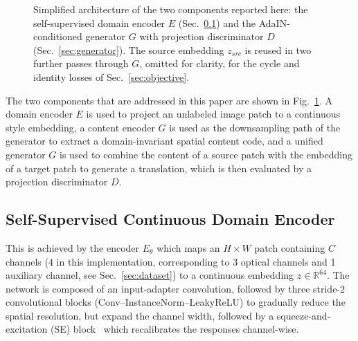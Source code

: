 \documentclass[conference]{IEEEtran}
\begin{document}
\begin{figure}[t]
{}
\caption{Simplified architecture of the two components reported here: the self-supervised domain encoder $E$ (Sec.~\ref{sec:encoder}) and the AdaIN-conditioned generator $G$ with projection discriminator $D$ (Sec.~\ref{sec:generator}). The source embedding $z_{src}$ is reused in two further passes through $G$, omitted for clarity, for the cycle and identity losses of Sec.~\ref{sec:objective}.}
\label{fig:architecture}
\end{figure}

The two components that are addressed in this paper are shown in Fig.~\ref{fig:architecture}. A domain encoder $E$ is used to project an unlabeled image patch to a continuous style embedding, a content encoder $G$ is used as the downsampling path of the generator to extract a domain-invariant spatial content code, and a unified generator $G$ is used to combine the content of a source patch with the embedding of a target patch to generate a translation, which is then evaluated by a projection discriminator $D$.

\subsection{Self-Supervised Continuous Domain Encoder}
\label{sec:encoder}
This is achieved by the encoder $E_\theta$ which maps an $H \times W$ patch containing $C$ channels (4 in this implementation, corresponding to 3 optical channels and 1 auxiliary channel, see Sec.~\ref{sec:dataset}) to a continuous embedding $z \in \mathbb{R}^{64}$. The network is composed of an input-adapter convolution, followed by three stride-2 convolutional blocks (Conv--InstanceNorm--LeakyReLU) to gradually reduce the spatial resolution, but expand the channel width, followed by a squeeze-and-excitation (SE) block~\cite{hu2018senet} which recalibrates the responses channel-wise.
\end{document}
